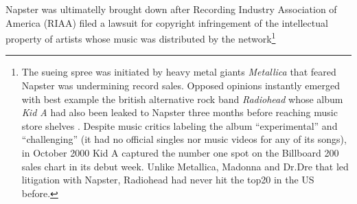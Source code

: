 \documentclass[acmcsur,acmnow]{acmtrans2m}
\begin{document}
Napster was ultimatelly brought down after Recording Industry Association of America (RIAA) filed a lawsuit for copyright infringement of the intellectual property of artists whose music was distributed by the network\footnote{
      The sueing spree was initiated by heavy metal giants \emph{Metallica} that feared Napster was undermining record sales. Opposed opinions instantly emerged  with best example the british alternative rock band \emph{Radiohead} whose album \emph{Kid A} had also been leaked to Napster three months before reaching music store shelves \cite{rm_radioheadkida_2000}. Despite music critics labeling the album ``experimental'' and ``challenging'' (it had no official singles nor music videos for any of its songs), in October 2000 Kid A captured the number one spot on the Billboard 200 sales chart in its debut week. Unlike Metallica, Madonna and Dr.Dre that led litigation with Napster, Radiohead had never hit the top20 in the US before.
}
\end{document}
